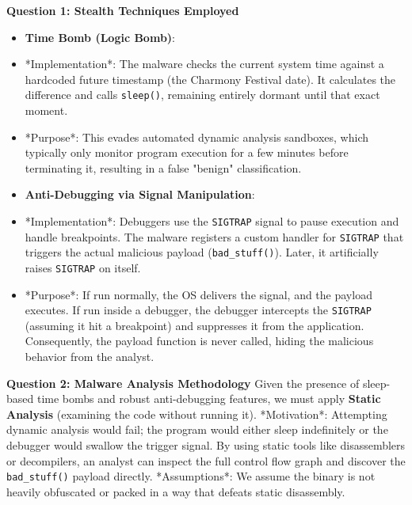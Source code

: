 \documentclass{article}
\begin{document}
\textbf{Question 1: Stealth Techniques Employed}
\begin{itemize}
    \item[\textbf{1.}] \textbf{Time Bomb (Logic Bomb)}:
    \item *Implementation*: The malware checks the current system time against a hardcoded future timestamp (the Charmony Festival date). It calculates the difference and calls \texttt{sleep()}, remaining entirely dormant until that exact moment.
    \item *Purpose*: This evades automated dynamic analysis sandboxes, which typically only monitor program execution for a few minutes before terminating it, resulting in a false "benign" classification.
    \item[\textbf{2.}] \textbf{Anti-Debugging via Signal Manipulation}:
    \item *Implementation*: Debuggers use the \texttt{SIGTRAP} signal to pause execution and handle breakpoints. The malware registers a custom handler for \texttt{SIGTRAP} that triggers the actual malicious payload (\texttt{bad\_stuff()}). Later, it artificially raises \texttt{SIGTRAP} on itself.
    \item *Purpose*: If run normally, the OS delivers the signal, and the payload executes. If run inside a debugger, the debugger intercepts the \texttt{SIGTRAP} (assuming it hit a breakpoint) and suppresses it from the application. Consequently, the payload function is never called, hiding the malicious behavior from the analyst.

\end{itemize}
\textbf{Question 2: Malware Analysis Methodology}
Given the presence of sleep-based time bombs and robust anti-debugging features, we must apply \textbf{Static Analysis} (examining the code without running it).
*Motivation*: Attempting dynamic analysis would fail; the program would either sleep indefinitely or the debugger would swallow the trigger signal. By using static tools like disassemblers or decompilers, an analyst can inspect the full control flow graph and discover the \texttt{bad\_stuff()} payload directly.
*Assumptions*: We assume the binary is not heavily obfuscated or packed in a way that defeats static disassembly.
\end{document}
